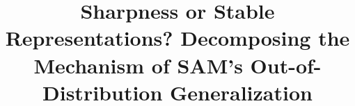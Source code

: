 \documentclass[10pt,twocolumn,letterpaper]{article}
\begin{document}
\title{Sharpness or Stable Representations? Decomposing the Mechanism of SAM's Out-of-Distribution Generalization}

\author{}

\maketitle















{\small


}
\end{document}

